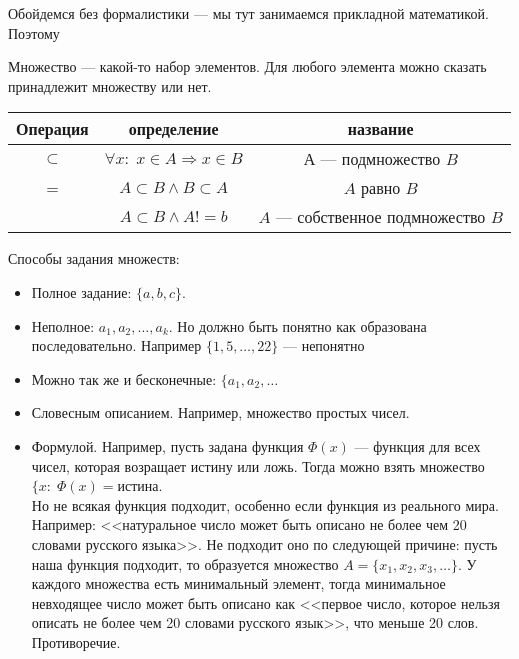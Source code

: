 Обойдемся без формалистики --- мы тут занимаемся прикладной математикой. Поэтому
 \begin{definition}
    Множество --- какой-то набор элементов. Для любого элемента можно сказать принадлежит множеству или нет.
\end{definition}
\begin{center}
    \begin{tabular}{| c | c | c |}
    \hline
    Операция & определение & название \\
    \hline
    \Large{$\subset$} & $\forall x: \; x \in A \Rightarrow x \in B$ & $А$ --- подмножество $B$ \\
    \hline
    \Large{=} & $A \subset B \land B \subset A$ & $A$ равно $B$ \\
    \hline
              & $A \subset B \land A != b $ &  $A$ --- собственное подмножество  $B$ \\
    \hline
    \end{tabular}
\end{center}
Способы задания множеств:
\begin{itemize}
    \item Полное задание: $\{a,b,c\}$.
    \item  Неполное: $a_1,a_2,\ldots, a_k$. Но должно быть понятно как образована последовательно. Например $\{1,5,\ldots,22\}$ --- непонятно
    \item Можно так же и бесконечные: $\{a_1,a_2,\ldots$
    \item Словесным описанием. Например, множество простых чисел.
    \item Формулой. Например, пусть задана функция $\Phi(x)$ --- функция для всех чисел, которая возращает истину или ложь. Тогда можно взять множество  $\{x: \; \Phi(x) = \text{истина}$. \\
            Но не всякая функция подходит, особенно если функция из реального мира. Например: <<натуральное число может быть описано не более чем 20 словами русского языка>>. Не подходит оно по следующей причине: пусть наша функция подходит, то образуется множество  $A = \{x_1, x_2,x_3,\ldots\}$. У каждого множества есть минимальный элемент, тогда минимальное невходящее число может быть описано как <<первое число, которое нельзя описать не более чем 20 словами русского язык>>, что меньше 20 слов. Противоречие.
\end{itemize}
